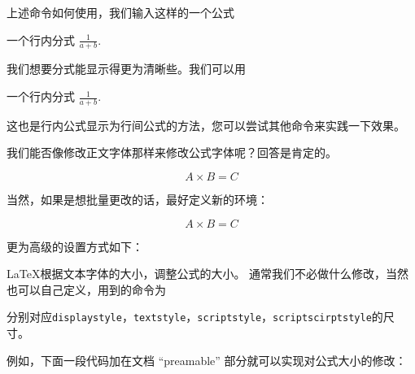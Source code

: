\jiejue

上述命令如何使用，我们输入这样的一个公式
\begin{example}
一个行内分式 $\frac{1}{a + b}$.
\end{example}
\noindent 我们想要分式能显示得更为清晰些。我们可以用
\begin{example}
一个行内分式 $\displaystyle\frac{1}{a + b}$.
\end{example}
\noindent 这也是行内公式显示为行间公式的方法，您可以尝试其他命令来实践一下效果。


我们能否像修改正文字体那样来修改公式字体呢？回答是肯定的。

\begin{example}
\begin{small}
\begin{equation}
	A \times B = C
\end{equation}
\end{small}
\end{example}

当然，如果是想批量更改的话，最好定义新的环境：
\begin{texlist}
\newenvironment{sequation}{\small\begin{equation}}{\end{equation}}
\newenvironment{tequation}{\tiny\begin{equation}}{\end{equation}}
\end{texlist}
\newenvironment{sequation}{\small\begin{equation}}{\end{equation}}
\newenvironment{tequation}{\tiny\begin{equation}}{\end{equation}}
\begin{example}
\begin{tequation}
	A \times B = C
\end{tequation}
\end{example}

\jieshi

更为高级的设置方式如下：

\LaTeX{}根据文本字体的大小，调整公式的大小。
通常我们不必做什么修改，当然也可以自己定义，用到的命令为 
\begin{texlist}
\end{texlist}
\noindent 分别对应\verb|displaystyle|，\verb|textstyle|，\verb|scriptstyle|，\verb|scriptscirptstyle|的尺寸。


例如，下面一段代码加在文档 ``preamable'' 部分就可以实现对公式大小的修改：

